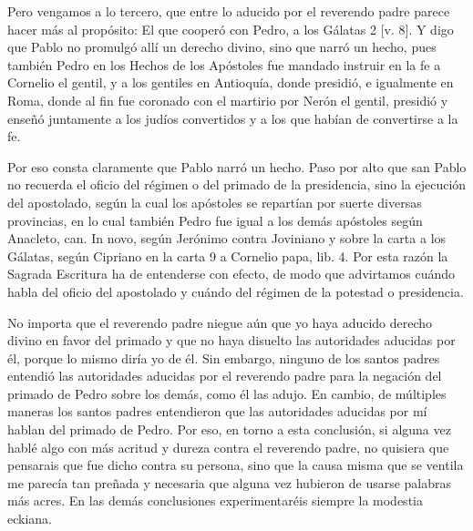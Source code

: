Pero vengamos a lo tercero, que entre lo aducido por el reverendo padre parece hacer más al propósito: El que cooperó con Pedro, a los Gálatas 2 [v. 8]. Y digo que Pablo no promulgó allí un derecho divino, sino que narró un hecho, pues también Pedro en los Hechos de los Apóstoles fue mandado instruir en la fe a Cornelio el gentil, y a los gentiles en Antioquía, donde presidió, e igualmente en Roma, donde al fin fue coronado con el martirio por Nerón el gentil, presidió y enseñó juntamente a los judíos convertidos y a los que habían \marginpar{\small[318]} de convertirse a la fe.

Por eso consta claramente que Pablo narró un hecho. Paso por alto que san Pablo no recuerda el oficio del régimen o del primado de la presidencia, sino la ejecución del apostolado, según la cual los apóstoles se repartían por suerte diversas provincias, en lo cual también Pedro fue igual a los demás apóstoles según Anacleto, can. In novo, según Jerónimo contra Joviniano y sobre la carta a los Gálatas, según Cipriano en la carta 9 a Cornelio papa, lib. 4. Por esta razón la Sagrada Escritura ha de entenderse con efecto, de modo que advirtamos cuándo habla del oficio del apostolado y cuándo del régimen de la potestad o presidencia.

No importa que el reverendo padre niegue aún que yo haya aducido derecho divino en favor del primado y que no haya disuelto las autoridades aducidas por él, porque lo mismo diría yo de él. Sin embargo, ninguno de los santos padres entendió las autoridades aducidas por el reverendo padre para la negación del primado de Pedro sobre los demás, como él las adujo. En cambio, de múltiples maneras los santos padres entendieron que las autoridades aducidas por mí hablan del primado de Pedro. Por eso, en torno a esta conclusión, si alguna vez hablé algo con más acritud y dureza contra el reverendo padre, no quisiera que pensarais que fue dicho contra su persona, sino que la causa misma que se ventila me parecía tan preñada y necesaria que alguna vez hubieron de usarse palabras más acres. En las demás conclusiones experimentaréis siempre la modestia eckiana.

